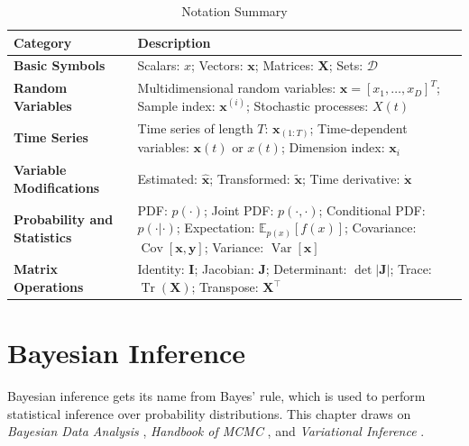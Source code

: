 \begin{table}[htbp!]
\small
\centering
\renewcommand{\arraystretch}{1.5}
\begin{tabularx}{0.9\textwidth}{>{\bfseries}l X}
\toprule
Category & Description \\
\midrule
Basic Symbols &
Scalars: $x$; Vectors: $\boldsymbol{x}$; Matrices: $\boldsymbol{X}$; Sets: $\mathcal{D}$ \\
\midrule
Random Variables &
Multidimensional random variables: $\boldsymbol{x} = [x_1,\dots,x_D]^T$; Sample index: $\boldsymbol{x}^{(i)}$; Stochastic processes: $\mathit{X}(t)$ \\
\midrule
Time Series &
Time series of length $T$: $\boldsymbol{x}_{(1:T)}$; Time-dependent variables: $\boldsymbol{x}(t)$ or $x(t)$; Dimension index: $\boldsymbol{x}_i$ \\
\midrule
Variable Modifications &
Estimated: $\hat{\boldsymbol{x}}$; Transformed: $\tilde{\boldsymbol{x}}$; Time derivative: $\dot{\boldsymbol{x}}$ \\
\midrule
Probability and Statistics &
PDF: $p(\cdot)$; Joint PDF: $p(\cdot, \cdot)$; Conditional PDF: $p(\cdot |\cdot)$; Expectation: $\mathbb{E}_{p(x)}[f(x)]$; Covariance: $\operatorname{Cov}[\boldsymbol{x}, \boldsymbol{y}]$; Variance: $\operatorname{Var}[\boldsymbol{x}]$ \\
\midrule
Matrix Operations &
Identity: $\boldsymbol{I}$; Jacobian: $\boldsymbol{J}$; Determinant: $\det|\boldsymbol{J}|$; Trace: $\operatorname{Tr}(\boldsymbol{X})$; Transpose: $\boldsymbol{X}^\top$ \\
\bottomrule
\end{tabularx}
\caption{Notation Summary}
\label{tab:notation-summary}
\end{table}

\section{Bayesian Inference}
Bayesian inference gets its name from Bayes' rule, which is used to perform statistical inference over probability distributions.
This chapter draws on \textit{Bayesian Data Analysis} \citep{gelman2013bayesian}, \textit{Handbook of MCMC} \citep{Allen_2007}, and \textit{Variational Inference} \citep{Blei_2017}.

